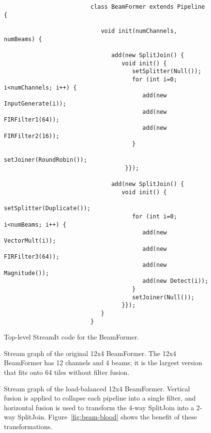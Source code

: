 \begin{figure}
\centering
\small
\begin{verbatim}
                         class BeamFormer extends Pipeline {
                         
                            void init(numChannels, numBeams) {
                         
                               add(new SplitJoin() { 
                                  void init() {
                                     setSplitter(Null());
                                     for (int i=0; i<numChannels; i++) {
                                        add(new InputGenerate(i));
                                        add(new FIRFilter1(64));
                                        add(new FIRFilter2(16));
                                     }
                                     setJoiner(RoundRobin());   
                                   }});
                            
                               add(new SplitJoin() {
                                  void init() {
                                     setSplitter(Duplicate());
                                     for (int i=0; i<numBeams; i++) {
                                        add(new VectorMult(i));
                                        add(new FIRFilter3(64));
                                        add(new Magnitude());
                                        add(new Detect(i));
                                     }
                                     setJoiner(Null());
                                  }});
                            }
                         }
\end{verbatim}
\caption{\protect\small Top-level StreamIt code for the BeamFormer.\protect\label{fig:beamcode}}
\end{figure}

\begin{figure}
\centering
{}
\caption{\protect\small Stream graph of the original 12x4 BeamFormer.  The 12x4 BeamFormer has 12 channels and 4 beams; it is the largest version that fits onto 64 tiles without filter fusion.  \protect\label{fig:beam-orig}}
\vspace{36pt}
\caption{\protect\small Stream graph of the load-balanced 12x4 BeamFormer.  Vertical fusion is applied to collapse each pipeline into a single filter, and horizontal fusion is used to transform the 4-way SplitJoin into a 2-way SplitJoin.
Figure~\ref{fig:beam-blood} shows the benefit of these
transformations. \protect\label{fig:beam-opt}}
\end{figure}

